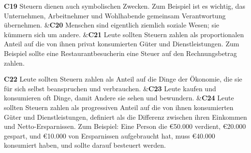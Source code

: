 \documentclass[
		11pt,
		a4paper,
		openright,
		oneside,
		ngerman
	]
	{book}
\begin{document}
\begin{longtabu}[htpb]
\textbf{C19} %
		Steuern dienen auch symbolischen Zwecken.
		Zum Beispiel ist es wichtig, das Unternehmen, Arbeitnehmer und Wohlhabende gemeinsam Verantwortung übernehmen.
&\textbf{C20}
		Menschen sind eigentlich ziemlich soziale Wesen; sie kümmern sich um andere.
&\textbf{C21} %
		Leute sollten Steuern zahlen als proportionalen Anteil auf die von ihnen privat konsumierten Güter und Dienstleistungen.
		Zum Beispiel sollte eine Restaurantbesucherin eine Steuer auf den Rechnungsbetrag zahlen.
\\

\midrule

\textbf{C22} %
		Leute sollten Steuern zahlen als Anteil auf die Dinge der Ökonomie, die sie für sich selbst beanspruchen und verbrauchen.
&\textbf{C23} %
		Leute kaufen und konsumieren oft Dinge, damit Andere sie sehen und bewundern.
&\textbf{C24} %
		Leute sollten Steuern zahlen als progressiven Anteil auf die von ihnen konsumierten Güter und Dienstleistungen, definiert als die Differenz zwischen ihren Einkommen und Netto-Ersparnissen.
		Zum Beispiel: Eine Person die \euro 50.000 verdient, \euro 20.000 gespart, und \euro 10.000 von Ersparnissen aufgebraucht hat, muss \euro 40.000 konsumiert haben, und sollte darauf besteuert werden.
\\

\midrule


\end{longtabu}
\end{document}
